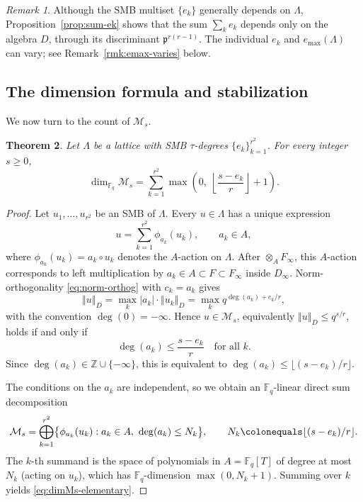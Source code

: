 \documentclass[12pt]{amsart}
\newtheorem{thm}{Theorem}[section]
\theoremstyle{definition}
\theoremstyle{remark}
\newtheorem{rem}[thm]{Remark}
\numberwithin{equation}{section}
\numberwithin{thm}{section}
\newcommand{\fp}{\mathfrak{p}}
\newcommand{\cM}{\mathcal{M}}
\newcommand{\F}{\mathbb{F}}
\newcommand{\Z}{\mathbb{Z}}
\newcommand{\Fi}{F_\infty}
\newcommand{\La}{\Lambda}
\newcommand{\norm}[1]{\left\Vert#1\right\Vert}
\newcommand{\abs}[1]{\left|#1\right|}
\begin{document}
	\begin{rem}\label{rmk:sum-ek-invariant}
		Although the SMB multiset $\{e_k\}$ generally depends on $\La$, Proposition~\ref{prop:sum-ek} shows that the sum $\sum_k e_k$ depends only on the algebra $D$, through its discriminant $\fp^{r(r-1)}$. The individual $e_k$ and $e_{\max}(\La)$ can vary; see Remark~\ref{rmk:emax-varies} below.
	\end{rem}
	
	\subsection{The dimension formula and stabilization}\label{sub:dim-formula}
	
	We now turn to the count of $\cM_s$. 
	
	\begin{thm}\label{thm:dimMs-elementary}
		Let $\La$ be a lattice with SMB $\tau$-degrees $\{e_k\}_{k=1}^{r^2}$. For every integer $s\geq 0$,
		\begin{equation}\label{eq:dimMs-elementary}
			\dim_{\F_q}\cM_s = \sum_{k=1}^{r^2} \max\!\left(0,\; \left\lfloor \frac{s - e_k}{r}\right\rfloor + 1\right).
		\end{equation}
	\end{thm}
	
	\begin{proof}
		Let $u_1, \ldots, u_{r^2}$ be an SMB of $\La$. Every $u\in \La$ has a unique expression
		\[
		u = \sum_{k=1}^{r^2} \phi_{a_k}(u_k), \qquad a_k \in A,
		\]
		where $\phi_{a_k}(u_k) = a_k \circ u_k$ denotes the $A$-action on $\La$. After $\otimes_A \Fi$, this $A$-action corresponds to left multiplication by $a_k \in A \subset F \subset \Fi$ inside $D_\infty$. Norm-orthogonality \eqref{eq:norm-orthog} with $c_k = a_k$ gives
		\[
		\norm{u}_D = \max_k \abs{a_k} \cdot \norm{u_k}_D = \max_k q^{\deg(a_k) + e_k/r},
		\]
		with the convention $\deg(0) = -\infty$. Hence $u \in \cM_s$, equivalently $\norm{u}_D \leq q^{s/r}$, holds if and only if
		\[
		\deg(a_k) \leq \frac{s - e_k}{r} \quad \text{for all } k.
		\]
		Since $\deg(a_k) \in \Z \cup \{-\infty\}$, this is equivalent to $\deg(a_k) \leq \lfloor(s-e_k)/r\rfloor$.
		
		The conditions on the $a_k$ are independent, so we obtain an $\F_q$-linear direct sum decomposition
		\[
		\cM_s = \bigoplus_{k=1}^{r^2} \bigl\{\phi_{a_k}(u_k) : a_k \in A,\ \deg(a_k) \leq N_k\bigr\}, \qquad N_k \colonequals \lfloor (s-e_k)/r\rfloor.
		\]
		The $k$-th summand is the space of polynomials in $A = \F_q[T]$ of degree at most $N_k$ (acting on $u_k$), which has $\F_q$-dimension $\max(0, N_k + 1)$. Summing over $k$ yields \eqref{eq:dimMs-elementary}.
	\end{proof}
	
\end{document}
